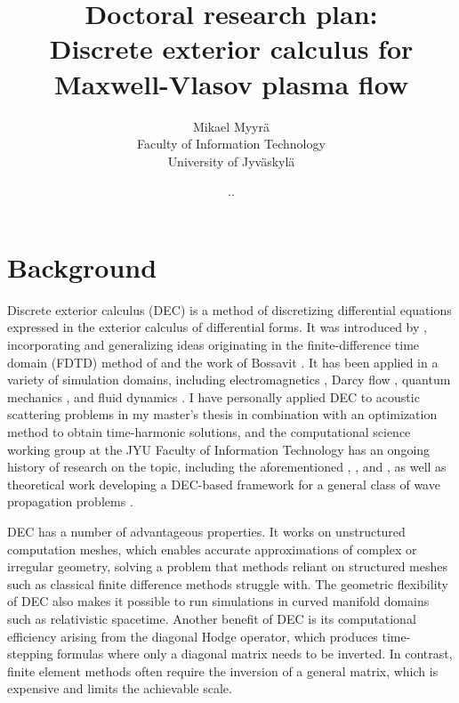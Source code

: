 \documentclass{article}
\title{Doctoral research plan: \\
Discrete exterior calculus for Maxwell-Vlasov plasma flow}
\author{Mikael Myyrä \\
Faculty of Information Technology \\
University of Jyväskylä}
\date{\number\day.\number\month.\number\year}
\begin{document}
\maketitle

\section*{Background}

Discrete exterior calculus (DEC) is a method of discretizing
differential equations expressed in the exterior calculus of differential forms.
It was introduced by \textcite{desbrun_discrete_2005},
incorporating and generalizing ideas originating
in the finite-difference time domain (FDTD)
method of \textcite{yee_numerical_1966} and the work of Bossavit
\parencite*{bossavit_geometry_1998,bossavit_computational_1999,
bossavit_computational_2000,bossavit_generalized_2001,bossavit_discretization_2005}.
It has been applied in a variety of simulation domains,
including electromagnetics \parencite{rabina_efficient_2015,monkola_discrete_2022},
Darcy flow \parencite{hirani_numerical_2015},
quantum mechanics \parencite{rabina_three-dimensional_2018,kivioja_evolution_2023},
and fluid dynamics \parencite{mohamed_discrete_2016,nitschke_discrete_2017}.
I have personally applied DEC to acoustic scattering problems
in my master's thesis \parencite{myyra_discrete_2023} 
in combination with an optimization method to obtain time-harmonic solutions,
and the computational science working group at the JYU Faculty of Information Technology
has an ongoing history of research on the topic,
including the aforementioned \textcite{rabina_efficient_2015}, \textcite{rabina_three-dimensional_2018},
and \textcite{monkola_discrete_2022},
as well as theoretical work developing a DEC-based framework
for a general class of wave propagation problems \parencite{rabina_generalized_2018}.

DEC has a number of advantageous properties.
It works on unstructured computation meshes,
which enables accurate approximations of complex or irregular geometry,
solving a problem that methods reliant on structured meshes
such as classical finite difference methods struggle with.
The geometric flexibility of DEC also makes it possible to run simulations
in curved manifold domains such as relativistic spacetime.
Another benefit of DEC is its computational efficiency
arising from the diagonal Hodge operator,
which produces time-stepping formulas where only a diagonal matrix needs to be inverted.
In contrast, finite element methods
often require the inversion of a general matrix, which is expensive
and limits the achievable scale.
\end{document}
